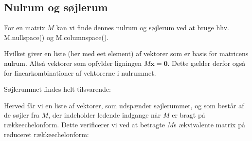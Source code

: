 \documentclass[letterpaper,10pt,english]{jupyterBook}
\begin{document}
\begin{sphinxVerbatim}[commandchars=\\\{\}]
     
\end{sphinxVerbatim}

\noindent{}


\subsection{Nulrum og søjlerum}
\label{\detokenize{notebooks/sympy/Notebook_LinAlg_2:nulrum-og-sojlerum}}
For en matrix \(M\) kan vi finde dennes nulrum og søjlerum ved at bruge hhv. M.nullspace() og M.columnspace().

\begin{sphinxVerbatim}[commandchars=\\\{\}]
  \PYG{p}{[}\PYG{p}{[}  \PYG{p}{]} \PYG{p}{[}  \PYG{p}{]} \PYG{p}{[}  \PYG{p}{]}\PYG{p}{]}
\end{sphinxVerbatim}

\noindent{}

\noindent{}

Hvilket giver en liste (her med eet element) af vektorer som er basis for matricens nulrum. Altså vektorer som opfylder ligningen \(M\boldsymbol{x} = \boldsymbol{0}\). Dette gælder derfor også for linearkombinationer af vektorerne i nulrummet.

Søjlerummet findes helt tilsvarende:

\begin{sphinxVerbatim}[commandchars=\\\{\}]
\end{sphinxVerbatim}

\noindent{}

Herved får vi en liste af vektorer, som udspænder søjlerummet, og som består af de søjler fra \(M\), der indeholder ledende indgange når \(M\) er bragt på række\sphinxhyphen{}echelonform. Dette verificerer vi ved at betragte \(M\)s ækvivalente matrix på reduceret række\sphinxhyphen{}echelonform:
\end{document}
